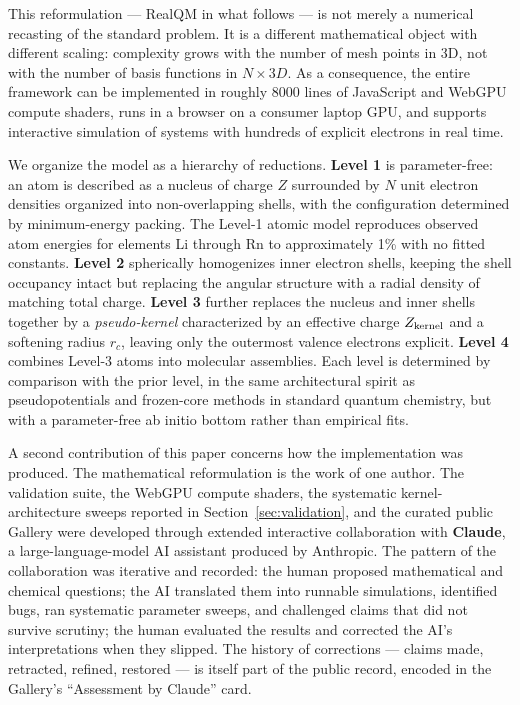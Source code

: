 \documentclass[11pt]{article}
\begin{document}
This reformulation --- RealQM in what follows --- is not merely a numerical recasting of the standard problem. It is a different mathematical object with different scaling: complexity grows with the number of mesh points in 3D, not with the number of basis functions in $N \times 3D$. As a consequence, the entire framework can be implemented in roughly 8000 lines of JavaScript and WebGPU compute shaders, runs in a browser on a consumer laptop GPU, and supports interactive simulation of systems with hundreds of explicit electrons in real time.

We organize the model as a hierarchy of reductions. \textbf{Level 1} is parameter-free: an atom is described as a nucleus of charge $Z$ surrounded by $N$ unit electron densities organized into non-overlapping shells, with the configuration determined by minimum-energy packing. The Level-1 atomic model reproduces observed atom energies for elements Li through Rn to approximately 1\% with no fitted constants. \textbf{Level 2} spherically homogenizes inner electron shells, keeping the shell occupancy intact but replacing the angular structure with a radial density of matching total charge. \textbf{Level 3} further replaces the nucleus and inner shells together by a \emph{pseudo-kernel} characterized by an effective charge $Z_{\rm kernel}$ and a softening radius $r_c$, leaving only the outermost valence electrons explicit. \textbf{Level 4} combines Level-3 atoms into molecular assemblies. Each level is determined by comparison with the prior level, in the same architectural spirit as pseudopotentials and frozen-core methods in standard quantum chemistry, but with a parameter-free ab initio bottom rather than empirical fits.

A second contribution of this paper concerns how the implementation was produced. The mathematical reformulation is the work of one author. The validation suite, the WebGPU compute shaders, the systematic kernel-architecture sweeps reported in Section~\ref{sec:validation}, and the curated public Gallery were developed through extended interactive collaboration with \textbf{Claude}, a large-language-model AI assistant produced by Anthropic. The pattern of the collaboration was iterative and recorded: the human proposed mathematical and chemical questions; the AI translated them into runnable simulations, identified bugs, ran systematic parameter sweeps, and challenged claims that did not survive scrutiny; the human evaluated the results and corrected the AI's interpretations when they slipped. The history of corrections --- claims made, retracted, refined, restored --- is itself part of the public record, encoded in the Gallery's ``Assessment by Claude'' card.
\end{document}

